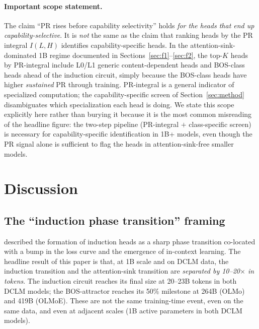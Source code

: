 \documentclass[11pt]{article}
\begin{document}
\paragraph{Important scope statement.} The claim ``PR rises before
capability selectivity'' holds \emph{for the heads that end up
capability-selective}. It is \emph{not} the same as the claim that
ranking heads by the PR integral $I(L,H)$ identifies capability-specific
heads. In the attention-sink-dominated 1B regime documented in
Sections~\ref{sec:f1}--\ref{sec:f2}, the top-$K$ heads by PR-integral
include L0/L1 generic content-dependent heads and BOS-class heads ahead
of the induction circuit, simply because the BOS-class heads have higher
\emph{sustained} PR through training. PR-integral is a general indicator
of specialized computation; the capability-specific screen of
Section~\ref{sec:method} disambiguates which specialization each head
is doing. We state this scope explicitly here rather than burying it
because it is the most common misreading of the headline figure: the
two-step pipeline (PR-integral $+$ class-specific screen) is necessary
for capability-specific identification in 1B+ models, even though the
PR signal alone is sufficient to flag the heads in
attention-sink-free smaller models.

\section{Discussion}
\label{sec:discussion}

\subsection{The ``induction phase transition'' framing}

\citet{olsson2022} described the formation of induction heads as a sharp
phase transition co-located with a bump in the loss curve and the
emergence of in-context learning. The headline result of this paper is
that, at 1B scale and on DCLM data, the induction transition and the
attention-sink transition are \emph{separated by 10--20$\times$ in
tokens}. The induction circuit reaches its final size at 20--23B tokens
in both DCLM models; the BOS-attractor reaches its 50\% milestone at
264B (OLMo) and 419B (OLMoE). These are not the same training-time event,
even on the same data, and even at adjacent scales (1B active parameters
in both DCLM models).
\end{document}
